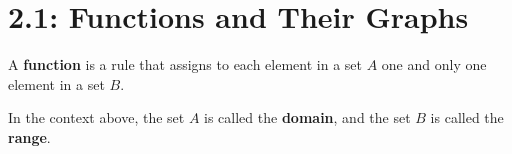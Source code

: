 \documentclass[../mathNotesPreamble]{subfiles}
\providecommand{\relscalefact}{1.4}
\begin{document}
\relscale{\relscalefact}
  \section{2.1: Functions and Their Graphs}
  \begin{defn*}
    A \textbf{function} is a rule that assigns to each element in a set $A$ one and only one element in a set $B$.

    In the context above, the set $A$ is called the \textbf{domain}, and the set $B$ is called the \textbf{range}.
  \end{defn*}

  \noindent
  \begin{minipage}{0.495\linewidth}
    \newcommand{\funcMachine}{--++(0,-vert) --++(dx,-dy) |- ++(-a,-vert) |- ++(c,-h)
      -- ++(0,-vert) --++(-dx, -dy) {[sharp corners] --++(0,-vert-vgap) %
      --++(b+2*dx,0)} --++(0,vert+vgap) --++(-dx,dy) |- ++(a,vert)
      -- ++(0,h) -| ++(-c,vert) --++(dx,dy) --++(0,vert); %
    }
    \centering
  \end{minipage}\hfill%
\end{document}
